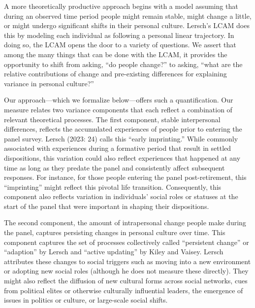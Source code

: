 \documentclass[
  12pt,
]{article}
\begin{document}
A more theoretically productive approach begins with a model assuming
that during an observed time period people might remain stable, might
change a little, or might undergo significant shifts in their personal
culture. Lersch's LCAM does this by modeling each individual as
following a personal linear trajectory. In doing so, the LCAM opens the
door to a variety of questions. We assert that among the many things
that can be done with the LCAM, it provides the opportunity to shift
from asking, ``do people change?'' to asking, ``what are the relative
contributions of change and pre-existing differences for explaining
variance in personal culture?''

Our approach---which we formalize below---offers such a quantification.
Our measure relates two variance components that each reflect a
combination of relevant theoretical processes. The first component,
stable interpersonal differences, reflects the accumulated experiences
of people prior to entering the panel survey. Lersch (2023: 24) calls
this ``early imprinting.'' While commonly associated with experiences
during a formative period that result in settled dispositions, this
variation could also reflect experiences that happened at any time as
long as they predate the panel and consistently affect subsequent
responses. For instance, for those people entering the panel
post-retirement, this ``imprinting'' might reflect this pivotal life
transition. Consequently, this component also reflects variation in
individuals' social roles or statuses at the start of the panel that
were important in shaping their dispositions.

The second component, the amount of intrapersonal change people make
during the panel, captures persisting changes in personal culture over
time. This component captures the set of processes collectively called
``persistent change'' or ``adaption'' by Lersch and ``active updating''
by Kiley and Vaisey. Lersch attributes these changes to social triggers
such as moving into a new environment or adopting new social roles
(although he does not measure these directly). They might also reflect
the diffusion of new cultural forms across social networks, cues from
political elites or otherwise culturally influential leaders, the
emergence of issues in politics or culture, or large-scale social
shifts.
\end{document}
